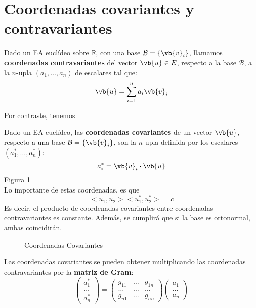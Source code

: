 \documentclass{./Geometria.tex}
\begin{document}
\section{Coordenadas covariantes y contravariantes}
\begin{defin}
	Dado un EA euclídeo sobre $\mathbb{R}$, con una base $\mathcal{B}= \{ \vb{v}_{i} \}$, llamamos \textbf{coordenadas contravariantes} del vector $\vb{u}\in E$, respecto a la base $\mathcal{B}$, a la $n$-upla $(a_1,\dots ,a_{n})$ de escalares tal que:
	\[
		\vb{u} = \sum^{n}_{i=1} a_{i} \vb{v}_{i}
	\]
\end{defin}
Por contraste, tenemos
\pagebreak
\begin{defin}
	Dado un EA euclídeo, las \textbf{coordenadas covariantes} de un vector $\vb{u}$, respecto a una base $\mathcal{B} = \{ \vb{v}_{i} \}$, son la $n$-upla definida por los escalares $(a^{*}_{1},\dots ,a^{*}_{n})$:
	\[
		a^{*}_{i} = \vb{v}_{i}\cdot \vb{u}
	\]
	Figura \ref{fig:coords-covariantes}\\
Lo importante de estas coordenadas, es que
\[
	<u_1,u_2><u_1^{*},u_2^{*}> = c
\]
Es decir, el producto de coordenadas covariantes entre coordenadas contravariantes es constante. Además, se cumplirá que si la base es ortonormal, ambas coincidirán.
\end{defin}
\begin{figure}[ht]
    \centering
    \caption{Coordenadas Covariantes}
    \label{fig:coords-covariantes}
\end{figure}
Las coordenadas covariantes se pueden obtener multiplicando las coordenadas contravariantes por la \textbf{matriz de Gram}:
\[
	\begin{pmatrix} a_1^{*}\\\dots \\ a_{n}^{*} \end{pmatrix}=
	\begin{pmatrix} g_{11} & \dots & g_{1n}\\
		\dots & \dots &\dots \\
		g_{n 1} & \dots & g_{nn}
	\end{pmatrix} \begin{pmatrix} a_1\\ \dots \\ a_{n} \end{pmatrix} 
\]
\pagebreak
\end{document}
